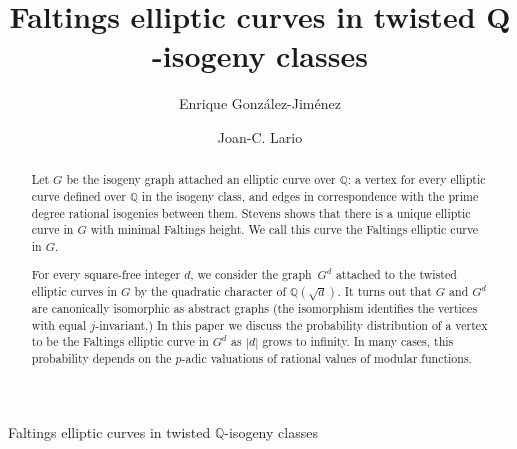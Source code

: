 \documentclass{ws-ijnt}
\newcommand{\Q}{\mathbb Q}
\begin{document}
{Faltings elliptic curves in twisted $\Q$-isogeny classes}

%
\catchline{}{}{}{}{}
%

\title{
Faltings elliptic curves in twisted $\mathbf{Q}$-isogeny classes
}

\author{Enrique González-Jiménez
}

\address{
University Department, University Name, Address\\
City, State ZIP/Zone,Country\,
\\
}

\author{Joan-C. Lario}

\address{Departament de Matemàtiques, 
Univrersitat Politècnica de Catalunya \\
Barcelona, Catalunya\\
joan.carles.lario@upc.edu }

\maketitle

\begin{history}
\end{history}

\begin{abstract}
Let $G$ be the isogeny graph attached an elliptic curve over $\Q$: a vertex for every elliptic curve defined over $\Q$ in the isogeny class, and edges in correspondence with the  prime degree rational isogenies 
between them. Stevens shows that there is a unique elliptic curve in $G$ with minimal Faltings height. 
We call  this curve the Faltings elliptic curve in $G$.

For every  square-free integer $d$, we consider the graph~$G^d$
attached to the twisted elliptic curves in $G$ 
by the quadratic character of $\Q(\sqrt{d})$.
It turns out that 
$G$ and $G^d$ are canonically isomorphic as abstract graphs
(the isomorphism identifies the vertices with equal $j$-invariant.)
In this paper we discuss the probability distribution of a vertex to be the Faltings elliptic curve in $G^d$ as $|d|$ grows to infinity. In many cases, this probability depends on the $p$-adic valuations of rational values of modular functions.
\end{abstract}
\end{document}
